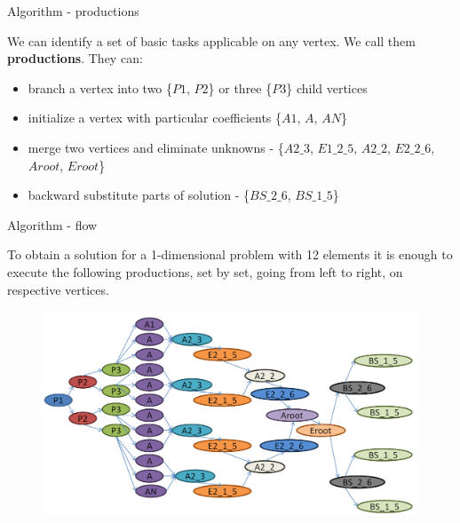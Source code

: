 \documentclass[c]{beamer}
\begin{document}

\begin{frame}{Algorithm - productions}

We can identify a set of basic tasks applicable on any vertex. We call them \textbf{productions}. They can:
\begin{itemize}
  \item branch a vertex into two \{$P1$, $P2$\} or three \{$P3$\} child vertices
  \item initialize a vertex with particular coefficients \{$A1$, $A$, $AN$\}
  \item merge two vertices and eliminate unknowns -  \{$A2\_3$, $E1\_2\_5$, $A2\_2$, $E2\_2\_6$, $Aroot$, $Eroot$\} 
  \item backward substitute parts of solution - \{$BS\_2\_6$, $BS\_1\_5$\}
\end{itemize}

\end{frame}


\begin{frame}{Algorithm - flow}

To obtain a solution for a 1-dimensional problem with 12 elements it is enough to execute the following productions, set by set, going from left to right, on respective vertices.

	\begin{figure}
      \centering
      \includegraphics[width=1\textwidth]{img/task_tree}
    \end{figure}

\end{frame}

\end{document}

